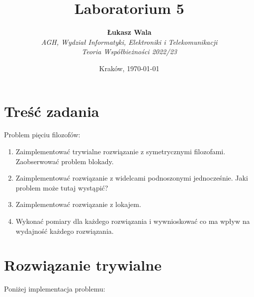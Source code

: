 \documentclass{article}
\title{Laboratorium 5}
\author{\textbf{Łukasz Wala}\\
    \textit{AGH, Wydział Informatyki, Elektroniki i Telekomunikacji} \\
    \textit{Teoria Współbieżności 2022/23}}
\date{Kraków, \today}
\begin{document}
\maketitle

\section{Treść zadania}
Problem pięciu filozofów:
\begin{enumerate}
    \item 
    Zaimplementować trywialne rozwiązanie z symetrycznymi filozofami. Zaobserwować problem blokady.
    \item
    Zaimplementować rozwiązanie z widelcami podnoszonymi jednocześnie. Jaki problem może tutaj wystąpić?
    \item
    Zaimplementować rozwiązanie z lokajem.
    \item
    Wykonać pomiary dla każdego rozwiązania i wywnioskować co ma wpływ na wydajność każdego rozwiązania.
\end{enumerate}

\section{Rozwiązanie trywialne}
Poniżej implementacja problemu:
\end{document}
